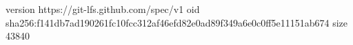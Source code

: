 version https://git-lfs.github.com/spec/v1
oid sha256:f141db7ad190261fc10fcc312af46efd82e0ad89f349a6e0c0ff5e11151ab674
size 43840
